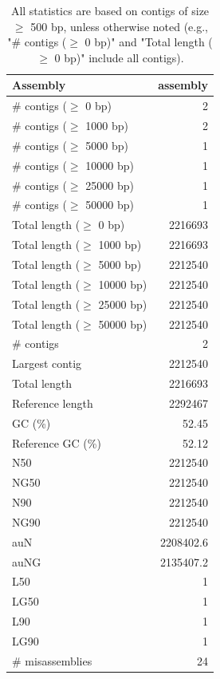 \documentclass[12pt,a4paper]{article}
\begin{document}
\begin{table}[ht]
\begin{center}
\caption{All statistics are based on contigs of size $\geq$ 500 bp, unless otherwise noted (e.g., "\# contigs ($\geq$ 0 bp)" and "Total length ($\geq$ 0 bp)" include all contigs).}
\begin{tabular}{|l*{1}{|r}|}
\hline
Assembly & assembly \\ \hline
\# contigs ($\geq$ 0 bp) & 2 \\ \hline
\# contigs ($\geq$ 1000 bp) & 2 \\ \hline
\# contigs ($\geq$ 5000 bp) & 1 \\ \hline
\# contigs ($\geq$ 10000 bp) & 1 \\ \hline
\# contigs ($\geq$ 25000 bp) & 1 \\ \hline
\# contigs ($\geq$ 50000 bp) & 1 \\ \hline
Total length ($\geq$ 0 bp) & 2216693 \\ \hline
Total length ($\geq$ 1000 bp) & 2216693 \\ \hline
Total length ($\geq$ 5000 bp) & 2212540 \\ \hline
Total length ($\geq$ 10000 bp) & 2212540 \\ \hline
Total length ($\geq$ 25000 bp) & 2212540 \\ \hline
Total length ($\geq$ 50000 bp) & 2212540 \\ \hline
\# contigs & 2 \\ \hline
Largest contig & 2212540 \\ \hline
Total length & 2216693 \\ \hline
Reference length & 2292467 \\ \hline
GC (\%) & 52.45 \\ \hline
Reference GC (\%) & 52.12 \\ \hline
N50 & 2212540 \\ \hline
NG50 & 2212540 \\ \hline
N90 & 2212540 \\ \hline
NG90 & 2212540 \\ \hline
auN & 2208402.6 \\ \hline
auNG & 2135407.2 \\ \hline
L50 & 1 \\ \hline
LG50 & 1 \\ \hline
L90 & 1 \\ \hline
LG90 & 1 \\ \hline
\# misassemblies & 24 \\ \hline

\end{tabular}
\end{center}
\end{table}
\end{document}
